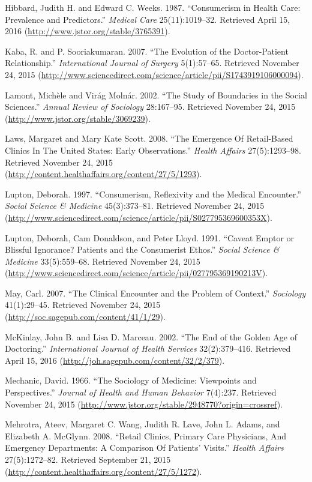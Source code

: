 \documentclass[12pt,twoside]{reedthesis}
\begin{document}
  Hibbard, Judith H. and Edward C. Weeks. 1987. ``Consumerism in Health
  Care: Prevalence and Predictors.'' \emph{Medical Care} 25(11):1019--32.
  Retrieved April 15, 2016 (\url{http://www.jstor.org/stable/3765391}).
  
  Kaba, R. and P. Sooriakumaran. 2007. ``The Evolution of the
  Doctor-Patient Relationship.'' \emph{International Journal of Surgery}
  5(1):57--65. Retrieved November 24, 2015
  (\url{http://www.sciencedirect.com/science/article/pii/S1743919106000094}).
  
  Lamont, Mich{è}le and Vir{á}g Moln{á}r. 2002. ``The Study of Boundaries
  in the Social Sciences.'' \emph{Annual Review of Sociology} 28:167--95.
  Retrieved November 24, 2015 (\url{http://www.jstor.org/stable/3069239}).
  
  Laws, Margaret and Mary Kate Scott. 2008. ``The Emergence Of
  Retail-Based Clinics In The United States: Early Observations.''
  \emph{Health Affairs} 27(5):1293--98. Retrieved November 24, 2015
  (\url{http://content.healthaffairs.org/content/27/5/1293}).
  
  Lupton, Deborah. 1997. ``Consumerism, Reflexivity and the Medical
  Encounter.'' \emph{Social Science \& Medicine} 45(3):373--81. Retrieved
  November 24, 2015
  (\url{http://www.sciencedirect.com/science/article/pii/S027795369600353X}).
  
  Lupton, Deborah, Cam Donaldson, and Peter Lloyd. 1991. ``Caveat Emptor
  or Blissful Ignorance? Patients and the Consumerist Ethos.''
  \emph{Social Science \& Medicine} 33(5):559--68. Retrieved November 24,
  2015
  (\url{http://www.sciencedirect.com/science/article/pii/027795369190213V}).
  
  May, Carl. 2007. ``The Clinical Encounter and the Problem of Context.''
  \emph{Sociology} 41(1):29--45. Retrieved November 24, 2015
  (\url{http://soc.sagepub.com/content/41/1/29}).
  
  McKinlay, John B. and Lisa D. Marceau. 2002. ``The End of the Golden Age
  of Doctoring.'' \emph{International Journal of Health Services}
  32(2):379--416. Retrieved April 15, 2016
  (\url{http://joh.sagepub.com/content/32/2/379}).
  
  Mechanic, David. 1966. ``The Sociology of Medicine: Viewpoints and
  Perspectives.'' \emph{Journal of Health and Human Behavior} 7(4):237.
  Retrieved November 24, 2015
  (\url{http://www.jstor.org/stable/2948770?origin=crossref}).
  
  Mehrotra, Ateev, Margaret C. Wang, Judith R. Lave, John L. Adams, and
  Elizabeth A. McGlynn. 2008. ``Retail Clinics, Primary Care Physicians,
  And Emergency Departments: A Comparison Of Patients' Visits.''
  \emph{Health Affairs} 27(5):1272--82. Retrieved September 21, 2015
  (\url{http://content.healthaffairs.org/content/27/5/1272}).
  
\end{document}
